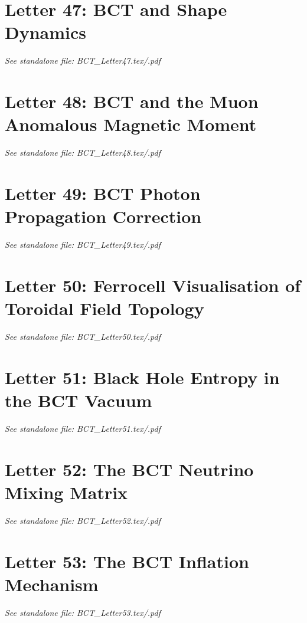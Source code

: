 \documentclass[aps,preprint,superscriptaddress,floatfix]{revtex4-2}
\begin{document}
\newpage
\section*{Letter 47: BCT and Shape Dynamics}
\textit{See standalone file: BCT\_Letter47.tex/.pdf}

\newpage
\section*{Letter 48: BCT and the Muon Anomalous Magnetic Moment}
\textit{See standalone file: BCT\_Letter48.tex/.pdf}

\newpage
\section*{Letter 49: BCT Photon Propagation Correction}
\textit{See standalone file: BCT\_Letter49.tex/.pdf}

\newpage
\section*{Letter 50: Ferrocell Visualisation of Toroidal Field Topology}
\textit{See standalone file: BCT\_Letter50.tex/.pdf}

\newpage
\section*{Letter 51: Black Hole Entropy in the BCT Vacuum}
\textit{See standalone file: BCT\_Letter51.tex/.pdf}

\newpage
\section*{Letter 52: The BCT Neutrino Mixing Matrix}
\textit{See standalone file: BCT\_Letter52.tex/.pdf}

\newpage
\section*{Letter 53: The BCT Inflation Mechanism}
\textit{See standalone file: BCT\_Letter53.tex/.pdf}
\end{document}
